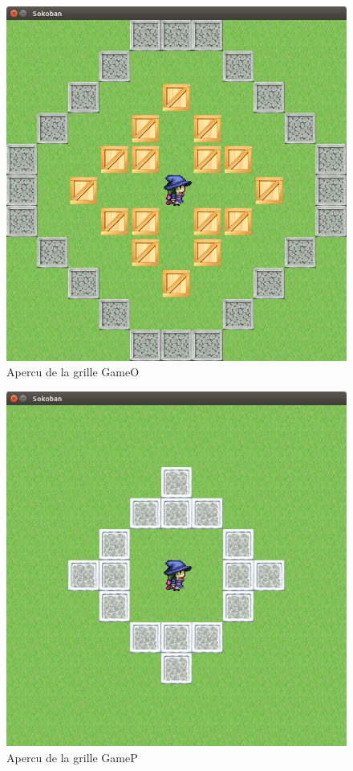 \documentclass{article}
\begin{document}
\begin{figure}[!h]
\centering
\includegraphics[scale=0.25]{img/06.png}
\caption{Apercu de la grille GameO}
\end{figure}

\begin{figure}[!h]
\centering
\includegraphics[scale=0.25]{img/07.png}
\caption{Apercu de la grille GameP}
\end{figure}
\newpage
\end{document}
